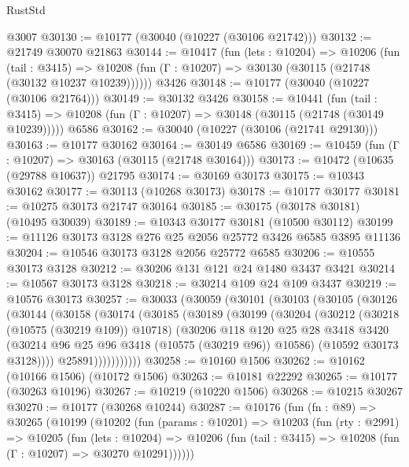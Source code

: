 \begin{lexlean}{RustStd}
\begin{coremodule}
    @3007
@30130 := @10177 (@30040 (@10227 (@30106 @21742)))
@30132 := @21749 @30070 @21863
@30144 := @10417
    (fun (lets : @10204) =>
    @10206
      (fun (tail : @3415) =>
      @10208 (fun (Γ : @10207) => @30130 (@30115 (@21748 (@30132 @10237 @10239))))))
    @3426
@30148 := @10177 (@30040 (@10227 (@30106 @21764)))
@30149 := @30132 @3426
@30158 := @10441
    (fun (tail : @3415) => @10208 (fun (Γ : @10207) => @30148 (@30115 (@21748 (@30149 @10239)))))
    @6586
@30162 := @30040 (@10227 (@30106 (@21741 @29130)))
@30163 := @10177 @30162
@30164 := @30149 @6586
@30169 := @10459 (fun (Γ : @10207) => @30163 (@30115 (@21748 @30164)))
@30173 := @10472 (@10635 (@29788 @10637)) @21795
@30174 := @30169 @30173
@30175 := @10343 @30162
@30177 := @30113 (@10268 @30173)
@30178 := @10177 @30177
@30181 := @10275 @30173 @21747 @30164
@30185 := @30175 (@30178 @30181) (@10495 @30039)
@30189 := @10343 @30177 @30181 (@10500 @30112)
@30199 := @11126 @30173 @3128 @276 @25 @2056 @25772 @3426 @6585 @3895 @11136
@30204 := @10546 @30173 @3128 @2056 @25772 @6585
@30206 := @10555 @30173 @3128
@30212 := @30206 @131 @121 @24 @1480 @3437 @3421
@30214 := @10567 @30173 @3128
@30218 := @30214 @109 @24 @109 @3437
@30219 := @10576 @30173
@30257 := @30033
    (@30059
      (@30101
        (@30103
          (@30105
            (@30126
              (@30144
                (@30158
                  (@30174
                    (@30185
                      (@30189
                        (@30199
                          (@30204
                            (@30212
                              (@30218 (@10575 (@30219 @109)) @10718)
                              (@30206
                                @118
                                @120
                                @25
                                @28
                                @3418
                                @3420
                                (@30214 @96 @25 @96 @3418 (@10575 (@30219 @96)) @10586)
                                (@10592 @30173 @3128))))
                          @25891)))))))))))
@30258 := @10160 @1506
@30262 := @10162 (@10166 @1506) (@10172 @1506)
@30263 := @10181 @22292
@30265 := @10177 (@30263 @10196)
@30267 := @10219 (@10220 @1506)
@30268 := @10215 @30267
@30270 := @10177 (@30268 @10244)
@30287 := @10176
    (fun (fn : @89) =>
    @30265
      (@10199
        (@10202
          (fun (params : @10201) =>
          @10203
            (fun (rty : @2991) =>
            @10205
              (fun (lets : @10204) =>
              @10206 (fun (tail : @3415) => @10208 (fun (Γ : @10207) => @30270 @10291))))))

\end{coremodule}
\end{lexlean}
